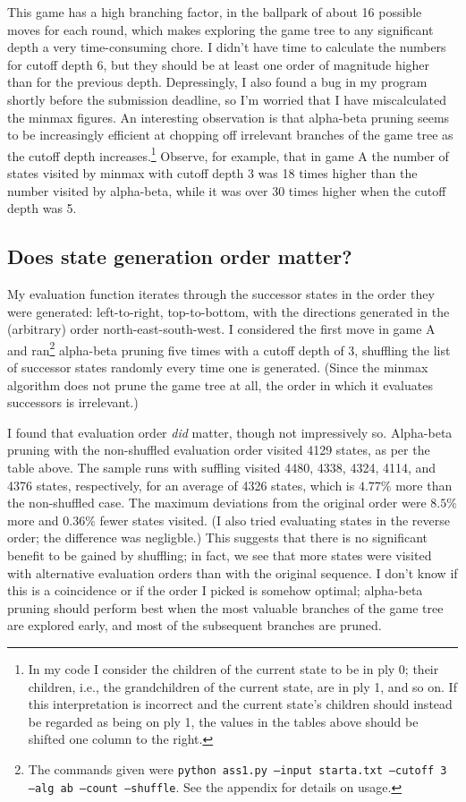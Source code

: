 \documentclass[letterpaper, 10pt]{article}
\numberwithin{theorem}{section}
\begin{document}
\noindent This game has a high branching factor, in the ballpark of about 16 possible moves for each round, which makes exploring the game tree to any significant depth a very time-consuming chore. I didn't have time to calculate the numbers for cutoff depth 6, but they should be at least one order of magnitude higher than for the previous depth. Depressingly, I also found a bug in my program shortly before the submission deadline, so I'm worried that I have miscalculated the minmax figures. An interesting observation is that alpha-beta pruning seems to be increasingly efficient at chopping off irrelevant branches of the game tree as the cutoff depth increases.\footnote{In my code I consider the children of the current state to be in ply 0; their children, i.e., the grandchildren of the current state, are in ply 1, and so on. If this interpretation is incorrect and the current state's children should instead be regarded as being on ply 1, the values in the tables above should be shifted one column to the right.} Observe, for example, that in game A the number of states visited by minmax with cutoff depth 3 was 18 times higher than the number visited by alpha-beta, while it was over 30 times higher when the cutoff depth was 5.

\subsection{Does state generation order matter?}
My evaluation function iterates through the successor states in the order they were generated: left-to-right, top-to-bottom, with the directions generated in the (arbitrary) order north-east-south-west. I considered the first move in game A and ran\footnote{The commands given were \texttt{python ass1.py --input starta.txt --cutoff 3 --alg ab --count --shuffle}. See the appendix for details on usage.} alpha-beta pruning five times with a cutoff depth of 3, shuffling the list of successor states randomly every time one is generated. (Since the minmax algorithm does not prune the game tree at all, the order in which it evaluates successors is irrelevant.) 

I found that evaluation order \emph{did} matter, though not impressively so. Alpha-beta pruning with the non-shuffled evaluation order visited 4129 states, as per the table above. The sample runs with suffling visited 4480, 4338, 4324, 4114, and 4376 states, respectively, for an average of 4326 states, which is $4.77\%$ more than the non-shuffled case. The maximum deviations from the original order were $8.5\%$ more and $0.36\%$ fewer states visited. (I also tried evaluating states in the reverse order; the difference was negligble.) This suggests that there is no significant benefit to be gained by shuffling; in fact, we see that more states were visited with alternative evaluation orders than with the original sequence. I don't know if this is a coincidence or if the order I picked is somehow optimal; alpha-beta pruning should perform best when the most valuable branches of the game tree are explored early, and most of the subsequent branches are pruned. 
\end{document}
